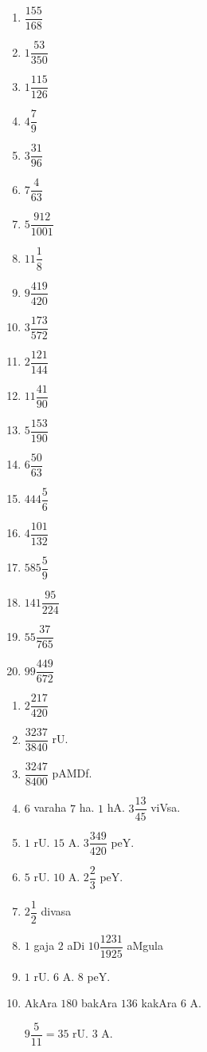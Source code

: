 \begin{multicols}{4}
\begin{enumerate}[$(1)$]
\item $\dfrac{155}{168}$
\item $1 \dfrac{53}{350}$
\item $1\dfrac{115}{126}$
\item $4 \dfrac{7}{9}$
\item $3 \dfrac{31}{96}$
\item $7\dfrac{4}{63}$
\item $5\dfrac{912}{1001}$
\item $11\dfrac{1}{8}$
\item $9\dfrac{419}{420}$
\item $3\dfrac{173}{572}$
\item $2\dfrac{121}{144}$
\item $11\dfrac{41}{90}$
\item $5\dfrac{153}{190}$
\item $6\dfrac{50}{63}$
\item $444\dfrac{5}{6}$
\item $4\dfrac{101}{132}$
\item $585\dfrac{5}{9}$
\item $141\dfrac{95}{224}$
\item $55\dfrac{37}{765}$
\item $99\dfrac{449}{672}$
\end{enumerate}
\end{multicols}


\begin{multicols}{2}
\begin{enumerate}[$(1)$]
\item $2 \dfrac{217}{420}$ 
\item $\dfrac{3237}{3840}$ rU.
\item $\dfrac{3247}{8400}$ pAMDf. 
\item $6$ varaha $7$ ha. $1$ hA. $3 \dfrac{13}{45}$ viVsa.
\item $1$ rU. $15$ A. $3 \dfrac{349}{420}$ peY. 
\item $5$ rU. $10$ A. $2 \dfrac{2}{3}$ peY.
\item $2 \dfrac{1}{2}$ divasa 
\item $1$ gaja $2$ aDi $10 \dfrac{1231}{1925}$ aMgula
\item $1$ rU. $6$ A. $8$ peY. 
\item AkAra $180$ bakAra $136$ kakAra $6$ A. 

      $9 \dfrac{5}{11}= 35$ rU. $3$ A.
\end{enumerate}
\end{multicols}

